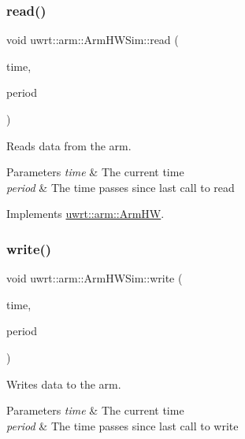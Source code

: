 \subsubsection{\texorpdfstring{read()}{read()}}
{\footnotesize\ttfamily void uwrt\+::arm\+::\+Arm\+H\+W\+Sim\+::read (\begin{DoxyParamCaption}\item[{const ros\+::\+Time \&}]{time,  }\item[{const ros\+::\+Duration \&}]{period }\end{DoxyParamCaption})\hspace{0.3cm}{\ttfamily [virtual]}}



Reads data from the arm. 


\begin{DoxyParams}{Parameters}
{\em time} & The current time \\
\hline
{\em period} & The time passes since last call to read \\
\hline
\end{DoxyParams}


Implements \hyperlink{classuwrt_1_1arm_1_1_arm_h_w_af2164103badfa99373f787b8a3cecb6b}{uwrt\+::arm\+::\+Arm\+HW}.

\mbox{\label{classuwrt_1_1arm_1_1_arm_h_w_sim_aa334fca03f76265ca8ec2da3be53991f}} 
\subsubsection{\texorpdfstring{write()}{write()}}
{\footnotesize\ttfamily void uwrt\+::arm\+::\+Arm\+H\+W\+Sim\+::write (\begin{DoxyParamCaption}\item[{const ros\+::\+Time \&}]{time,  }\item[{const ros\+::\+Duration \&}]{period }\end{DoxyParamCaption})\hspace{0.3cm}{\ttfamily [virtual]}}



Writes data to the arm. 


\begin{DoxyParams}{Parameters}
{\em time} & The current time \\
\hline
{\em period} & The time passes since last call to write \\
\hline
\end{DoxyParams}


